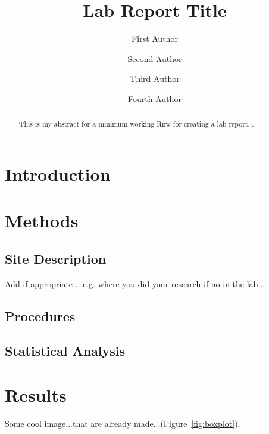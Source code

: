 \documentclass{article}\usepackage[]{graphicx}\usepackage[]{color}
\title{Lab Report Title}
\author[1]{First Author}
\author[2]{Second Author}
\author[1]{Third Author}
\author[3]{Fourth Author}
\affil[1]{Pitzer College, address...}
\affil[2]{Scripps Collge, address...}
\affil[3]{Pomona College, address...}
\begin{document}
\maketitle

\begin{abstract}
This is my abstract for a minimum working Rnw for creating a lab report...

\end{abstract}

\section{Introduction}


\section{Methods}

\subsection{Site Description}

Add if appropriate .. e.g. where you did your research if no in the lab... \citep{dris2015beyond}

\subsection{Procedures}

\subsection{Statistical Analysis}

\section{Results}

Some cool image...that are already made...(Figure~\ref{fig:boxplot}).
\end{document}
